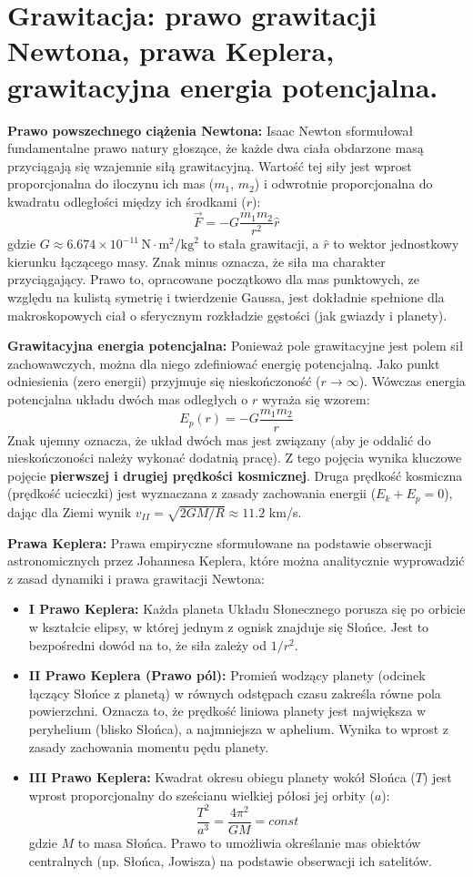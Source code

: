 \documentclass[11pt, a4paper]{article}
\begin{document}
\section{Grawitacja: prawo grawitacji Newtona, prawa Keplera, grawitacyjna energia potencjalna.}

\textbf{Prawo powszechnego ciążenia Newtona:}
Isaac Newton sformułował fundamentalne prawo natury głoszące, że każde dwa ciała obdarzone masą przyciągają się wzajemnie siłą grawitacyjną. Wartość tej siły jest wprost proporcjonalna do iloczynu ich mas ($m_1$, $m_2$) i odwrotnie proporcjonalna do kwadratu odległości między ich środkami ($r$):
\[
\vec{F} = -G \frac{m_1 m_2}{r^2} \hat{r}
\]
gdzie $G \approx 6.674 \times 10^{-11} \, \text{N}\cdot\text{m}^2/\text{kg}^2$ to stała grawitacji, a $\hat{r}$ to wektor jednostkowy kierunku łączącego masy. Znak minus oznacza, że siła ma charakter przyciągający. Prawo to, opracowane początkowo dla mas punktowych, ze względu na kulistą symetrię i twierdzenie Gaussa, jest dokładnie spełnione dla makroskopowych ciał o sferycznym rozkładzie gęstości (jak gwiazdy i planety).

\textbf{Grawitacyjna energia potencjalna:}
Ponieważ pole grawitacyjne jest polem sił zachowawczych, można dla niego zdefiniować energię potencjalną. Jako punkt odniesienia (zero energii) przyjmuje się nieskończoność ($r \to \infty$). Wówczas energia potencjalna układu dwóch mas odległych o $r$ wyraża się wzorem:
\[
E_p(r) = -G \frac{m_1 m_2}{r}
\]
Znak ujemny oznacza, że układ dwóch mas jest związany (aby je oddalić do nieskończoności należy wykonać dodatnią pracę). Z tego pojęcia wynika kluczowe pojęcie \textbf{pierwszej i drugiej prędkości kosmicznej}. Druga prędkość kosmiczna (prędkość ucieczki) jest wyznaczana z zasady zachowania energii ($E_k + E_p = 0$), dając dla Ziemi wynik $v_{II} = \sqrt{2GM/R} \approx 11.2$ km/s.

\textbf{Prawa Keplera:}
Prawa empiryczne sformułowane na podstawie obserwacji astronomicznych przez Johannesa Keplera, które można analitycznie wyprowadzić z zasad dynamiki i prawa grawitacji Newtona:
\begin{itemize}
    \item \textbf{I Prawo Keplera:} Każda planeta Układu Słonecznego porusza się po orbicie w kształcie elipsy, w której jednym z ognisk znajduje się Słońce. Jest to bezpośredni dowód na to, że siła zależy od $1/r^2$.
    \item \textbf{II Prawo Keplera (Prawo pól):} Promień wodzący planety (odcinek łączący Słońce z planetą) w równych odstępach czasu zakreśla równe pola powierzchni. Oznacza to, że prędkość liniowa planety jest największa w peryhelium (blisko Słońca), a najmniejsza w aphelium. Wynika to wprost z zasady zachowania momentu pędu planety.
    \item \textbf{III Prawo Keplera:} Kwadrat okresu obiegu planety wokół Słońca ($T$) jest wprost proporcjonalny do sześcianu wielkiej półosi jej orbity ($a$):
    \[
    \frac{T^2}{a^3} = \frac{4\pi^2}{GM} = const
    \]
    gdzie $M$ to masa Słońca. Prawo to umożliwia określanie mas obiektów centralnych (np. Słońca, Jowisza) na podstawie obserwacji ich satelitów.
\end{itemize}
\end{document}
